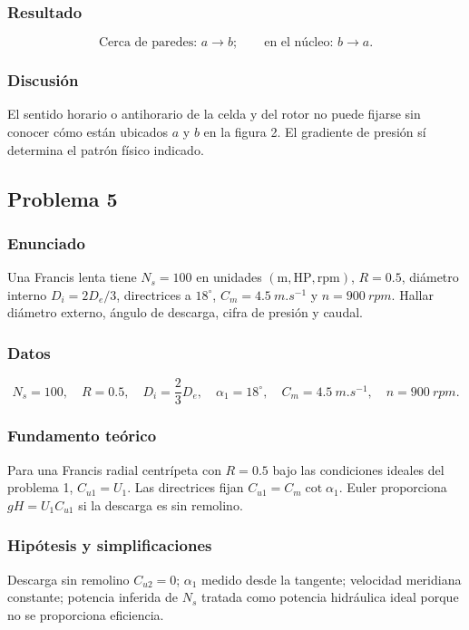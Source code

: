 \documentclass[12pt]{article}
\newcommand{\resultado}[1]{\[
  \boxed{\displaystyle #1}
\]}
\begin{document}
\subsubsection*{Resultado}
\resultado{\text{Cerca de paredes: }a\rightarrow b;\qquad
\text{en el núcleo: }b\rightarrow a.}

\subsubsection*{Discusión}
El sentido horario o antihorario de la celda y del rotor no puede fijarse sin conocer cómo
están ubicados $a$ y $b$ en la figura 2. El gradiente de presión sí determina el patrón físico
indicado.

\subsection{Problema 5}

\subsubsection*{Enunciado}
Una Francis lenta tiene $N_s=100$ en unidades $(\mathrm{m},\mathrm{HP},\mathrm{rpm})$,
$R=0.5$, diámetro interno $D_i=2D_e/3$, directrices a $18^\circ$,
$C_m=\SI{4.5}{m.s^{-1}}$ y $n=\SI{900}{rpm}$. Hallar diámetro externo, ángulo de descarga,
cifra de presión y caudal.

\subsubsection*{Datos}
\[
N_s=100,\quad R=0.5,\quad D_i=\frac{2}{3}D_e,\quad
\alpha_1=18^\circ,\quad C_m=\SI{4.5}{m.s^{-1}},\quad n=\SI{900}{rpm}.
\]

\subsubsection*{Fundamento teórico}
Para una Francis radial centrípeta con $R=0.5$ bajo las condiciones ideales del problema 1,
$C_{u1}=U_1$. Las directrices fijan $C_{u1}=C_m\cot\alpha_1$. Euler proporciona
$gH=U_1C_{u1}$ si la descarga es sin remolino.

\subsubsection*{Hipótesis y simplificaciones}
Descarga sin remolino $C_{u2}=0$; $\alpha_1$ medido desde la tangente; velocidad meridiana
constante; potencia inferida de $N_s$ tratada como potencia hidráulica ideal porque no se
proporciona eficiencia.
\end{document}

